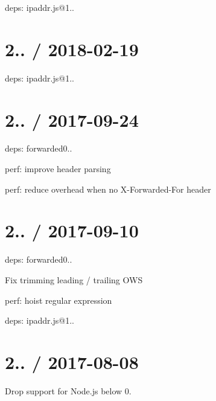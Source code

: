 
\begin{DoxyItemize}
\item deps\+: ipaddr.\+js@1..
\end{DoxyItemize}

\section*{2.. / 2018-\/02-\/19 }


\begin{DoxyItemize}
\item deps\+: ipaddr.\+js@1..
\end{DoxyItemize}

\section*{2.. / 2017-\/09-\/24 }


\begin{DoxyItemize}
\item deps\+: forwarded0..
\begin{DoxyItemize}
\item perf\+: improve header parsing
\item perf\+: reduce overhead when no {\ttfamily X-\/\+Forwarded-\/\+For} header
\end{DoxyItemize}
\end{DoxyItemize}

\section*{2.. / 2017-\/09-\/10 }


\begin{DoxyItemize}
\item deps\+: forwarded0..
\begin{DoxyItemize}
\item Fix trimming leading / trailing O\+WS
\item perf\+: hoist regular expression
\end{DoxyItemize}
\item deps\+: ipaddr.\+js@1..
\end{DoxyItemize}

\section*{2.. / 2017-\/08-\/08 }


\begin{DoxyItemize}
\item Drop support for Node.\+js below 0.
\end{DoxyItemize}

